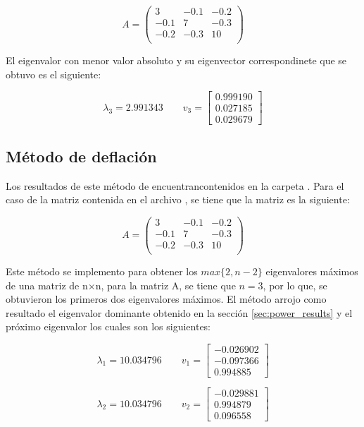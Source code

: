 \begin{equation*}
    A= \begin{pmatrix}
        3    & -0.1 & -0.2 \\
        -0.1 & 7    & -0.3 \\
        -0.2 & -0.3 & 10   \\
    \end{pmatrix}
\end{equation*}

El eigenvalor con menor valor absoluto y su eigenvector correspondinete que se obtuvo es el siguiente:

\begin{equation*}
    \lambda_3 = 2.991343 \qquad v_3 =
    \begin{bmatrix}
        0.999190 \\0.027185\\	0.029679
    \end{bmatrix}
\end{equation*}

\subsection{Método de deflación}

Los resultados de este método de encuentrancontenidos en la carpeta . Para el caso de la matriz contenida en el archivo , se tiene que la matriz es la siguiente:

\begin{equation*}
    A= \begin{pmatrix}
        3    & -0.1 & -0.2 \\
        -0.1 & 7    & -0.3 \\
        -0.2 & -0.3 & 10   \\
    \end{pmatrix}
\end{equation*}

Este método se implemento para obtener los $max\{2,n-2\}$ eigenvalores máximos de una matriz de n$ \times$n, para la matriz A, se tiene que $n=3$, por lo que, se obtuvieron los primeros dos eigenvalores máximos. El método arrojo como resultado el eigenvalor dominante obtenido en la sección \ref{sec:power_results} y el próximo eigenvalor los cuales son los siguientes:

\begin{equation*}
    \lambda_1 = 10.034796 \qquad v_1 =
    \begin{bmatrix}
        -0.026902 \\	-0.097366\\	0.994885
    \end{bmatrix}
\end{equation*}

\begin{equation*}
    \lambda_2 = 10.034796 \qquad v_2 =
    \begin{bmatrix}
        -0.029881 \\0.994879\\	0.096558
    \end{bmatrix}
\end{equation*}